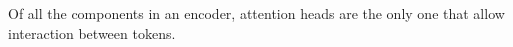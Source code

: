 \begin{description}
        \begin{remark}
            Of all the components in an encoder, attention heads are the only one that allow interaction between tokens.
        \end{remark}
\end{description}